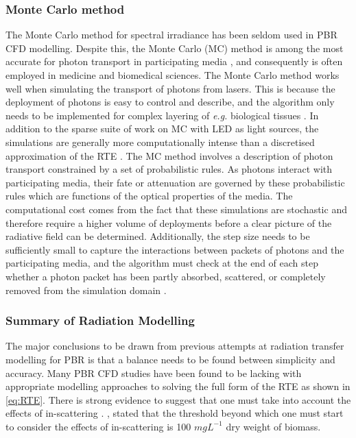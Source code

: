 \subsubsection{Monte Carlo method}
The Monte Carlo method for spectral irradiance has been seldom used in PBR CFD modelling. Despite this, the Monte Carlo (MC) method is among the most accurate for photon transport in participating media \cite{song2013}, and consequently is often employed in medicine and biomedical sciences\cite{doronin2011}. The Monte Carlo method works well when simulating the transport of photons from lasers. This is because the deployment of photons is easy to control and describe, and the algorithm only needs to be implemented for complex layering of \textit{e.g.} biological tissues \cite{song2013, wang1995a}. In addition to the sparse suite of work on MC with LED as light sources, the simulations are generally more computationally intense than a discretised approximation of the RTE \cite{kong2014}.
\skippingparagraph
The MC method involves a description of photon transport constrained by a set of probabilistic rules. As photons interact with participating media, their fate or attenuation are governed by these probabilistic rules which are functions of the optical properties of the media. The computational cost comes from the fact that these simulations are stochastic and therefore require a higher volume of deployments before a clear picture of the radiative field can be determined. Additionally, the step size needs to be sufficiently small to capture the interactions between packets of photons and the participating media, and the algorithm must check at the end of each step whether a photon packet has been partly absorbed, scattered, or completely removed from the simulation domain \cite{heinrich2012}.




\subsubsection{Summary of Radiation Modelling}
The major conclusions to be drawn from previous attempts at radiation transfer modelling for PBR is that a balance needs to be found between simplicity and accuracy. Many PBR CFD studies have been found to be lacking with appropriate modelling approaches to solving the full form of the RTE as shown in \eqref{eq:RTE}. There is strong evidence to suggest that one must take into account the effects of in-scattering \cite{heinrich2012,kong2014,modest2003,krishnamoorthy2014,lee2014,gao2016}. \cite{heinrich2012}, stated that the threshold beyond which one must start to consider the effects of in-scattering is 100 $mg L^{-1}$ dry weight of biomass. 
\skippingparagraph

